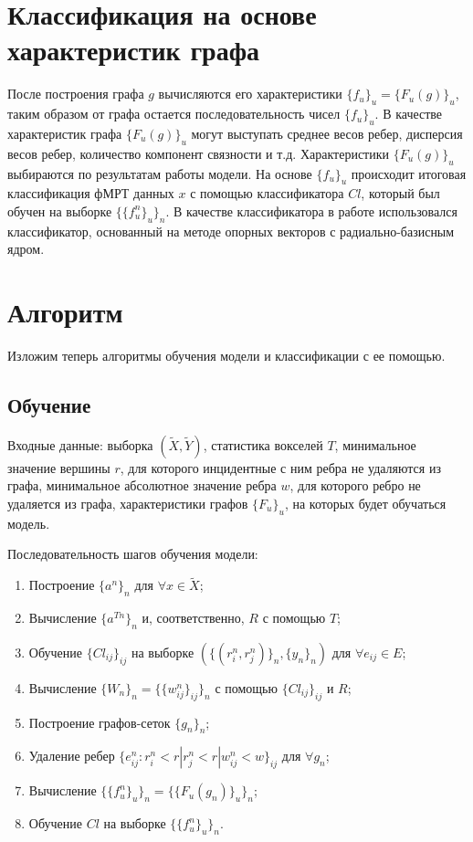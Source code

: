 \documentclass[specialist,
substylefile = spbu_report.rtx,
subf,href,colorlinks=true, 12pt]{disser}
\begin{document}
		\section{Классификация на основе характеристик графа}
			После построения графа $g$ вычисляются его характеристики $\{f_u\}_u = \{F_u(g)\}_u$, таким образом от графа остается последовательность чисел $\{f_u\}_u$. В качестве характеристик графа $\{F_u(g)\}_u$ могут выступать среднее весов ребер, дисперсия весов ребер, количество компонент связности и т.д. Характеристики $\{F_u(g)\}_u$ выбираются по результатам работы модели. На основе $\{f_u\}_u$ происходит итоговая классификация фМРТ данных $x$ с помощью классификатора $Cl$, который был обучен на выборке $\{\{f_u^n\}_u\}_n$. В качестве классификатора в работе использовался классификатор, основанный на методе опорных векторов с радиально-базисным ядром.
			
		\section{Алгоритм}
			Изложим теперь алгоритмы обучения модели и классификации с ее помощью. 
						
			\subsection{Обучение}
				Входные данные: выборка $(\widetilde{X}, \widetilde{Y})$, статистика вокселей $T$, минимальное значение вершины $r$, для которого инцидентные с ним ребра не удаляются из графа, минимальное абсолютное значение ребра $w$, для которого ребро не удаляется из графа, характеристики графов $\{F_u\}_u$, на которых будет обучаться модель.			
				
				Последовательность шагов обучения модели:
				\begin{enumerate}
					\item Построение $\{a^n\}_n$ для $\forall x \in \widetilde{X}$;
					\item Вычисление $\{a^{Tn}\}_n$ и, соответственно, $R$ с помощью $T$;
					\item Обучение  $\{Cl_{ij}\}_{ij}$ на выборке $(\{(r_i^n, r_j^n)\}_n, \{y_n\}_n)$ для $\forall e_{ij} \in E$;
					\item Вычисление $\{W_n\}_n = \{\{w_{ij}^n\}_{ij}\}_n$ с помощью $\{Cl_{ij}\}_{ij}$ и $R$;
					\item Построение графов-сеток $\{g_n\}_n$;
					\item Удаление ребер $\{e_{ij}^n : r_i^n < r | r_j^n < r | w_{ij}^n < w\}_{ij}$  для $\forall g_n$;
					\item Вычисление $\{\{f^n_u\}_u\}_n = \{\{F_u(g_n)\}_u\}_n$;
					\item Обучение $Cl$ на выборке $\{\{f^n_u\}_u\}_n$.
				\end{enumerate}
			
\end{document}
